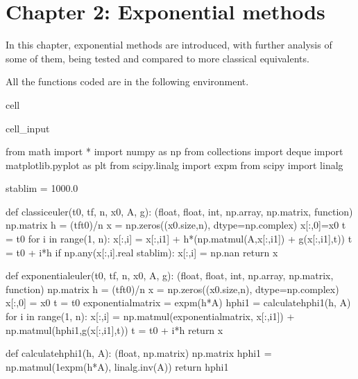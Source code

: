 \documentclass[letterpaper,10pt,english]{jupyterBook}
\begin{document}
\sphinxstepscope


\section{Chapter 2: Exponential methods}
\label{\detokenize{cap4:chapter-2-exponential-methods}}\label{\detokenize{cap4::doc}}
\sphinxAtStartPar
In this chapter, exponential methods are introduced, with further analysis of some of them, being tested and compared to more classical equivalents.

\sphinxAtStartPar
All the functions coded are in the following environment.

\begin{sphinxuseclass}{cell}\begin{sphinxVerbatimInput}

\begin{sphinxuseclass}{cell_input}
\begin{sphinxVerbatim}[commandchars=\\\{\}]
from math import *
import numpy as np
from collections import deque
import matplotlib.pyplot as plt
from scipy.linalg import expm
from scipy import linalg

stab\PYGZus{}lim = 1000.0

def classic\PYGZus{}euler(t0, tf, n, x0, A, g):
    \PYGZsq{}\PYGZsq{}\PYGZsq{}(float, float, int, np.array, np.matrix, function) \PYGZhy{}\PYGZgt{} np.matrix\PYGZsq{}\PYGZsq{}\PYGZsq{}
    h = (tf\PYGZhy{}t0)/n
    x = np.zeros((x0.size,n), dtype=np.complex\PYGZus{})
    x[:,0]=x0
    t = t0
    for i in range(1, n):
        x[:,i] = x[:,i\PYGZhy{}1] + h*(np.matmul(\PYGZhy{}A,x[:,i\PYGZhy{}1]) + g(x[:,i\PYGZhy{}1],t))
        t = t0 + i*h
        if np.any(x[:,i].real \PYGZgt{} stab\PYGZus{}lim):
            x[:,i] = np.nan
    return x

def exponential\PYGZus{}euler(t0, tf, n, x0, A, g):
    \PYGZsq{}\PYGZsq{}\PYGZsq{}(float, float, int, np.array, np.matrix, function) \PYGZhy{}\PYGZgt{} np.matrix\PYGZsq{}\PYGZsq{}\PYGZsq{}
    h = (tf\PYGZhy{}t0)/n
    x = np.zeros((x0.size,n), dtype=np.complex\PYGZus{})
    x[:,0] = x0
    t = t0
    exponential\PYGZus{}matrix = expm(\PYGZhy{}h*A)
    hphi1 = calculate\PYGZus{}hphi1(h, A)
    for i in range(1, n):
        x[:,i] = np.matmul(exponential\PYGZus{}matrix, x[:,i\PYGZhy{}1]) + np.matmul(hphi1,g(x[:,i\PYGZhy{}1],t))
        t = t0 + i*h
    return x

def calculate\PYGZus{}hphi1(h, A):
    \PYGZsq{}\PYGZsq{}\PYGZsq{}(float, np.matrix) \PYGZhy{}\PYGZgt{} np.matrix\PYGZsq{}\PYGZsq{}\PYGZsq{}
    hphi1 = np.matmul(1\PYGZhy{}expm(\PYGZhy{}h*A), linalg.inv(A))
    return hphi1


\end{sphinxVerbatim}
\end{sphinxuseclass}
\end{sphinxVerbatimInput}
\end{sphinxuseclass}
\end{document}
